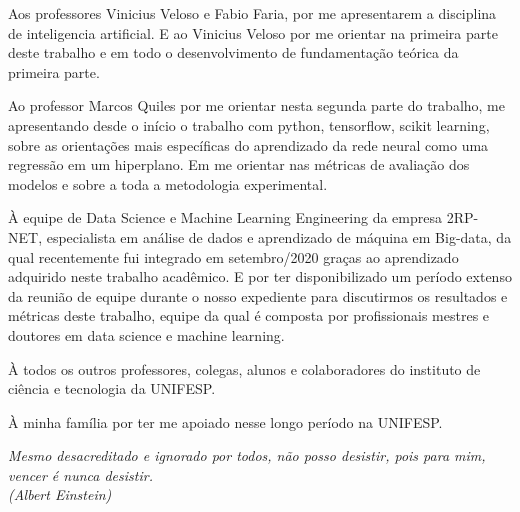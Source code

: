 \documentclass[	12pt, Times, openright, twoside, a4paper, english, brazil]{abntex2}
\begin{document}
\begin{agradecimentos}
            Aos professores Vinicius Veloso e Fabio Faria, por me apresentarem a disciplina de inteligencia artificial. E ao Vinicius Veloso por me orientar na primeira parte deste trabalho e em todo o desenvolvimento de fundamentação teórica da primeira parte.\newline
            
            Ao professor Marcos Quiles por me orientar nesta segunda parte do trabalho, me apresentando desde o início o trabalho com python, tensorflow, scikit learning, sobre as orientações mais específicas do aprendizado da rede neural como uma regressão em um hiperplano. Em me orientar nas métricas de avaliação dos modelos e sobre a toda a metodologia experimental.\newline
            
            À equipe de Data Science e Machine Learning Engineering da empresa 2RP-NET, especialista em análise de dados e aprendizado de máquina em Big-data, da qual recentemente fui integrado em setembro/2020 graças ao aprendizado adquirido neste trabalho acadêmico. E por ter disponibilizado um período extenso da reunião de equipe durante o nosso expediente para discutirmos os resultados e métricas deste trabalho, equipe da qual é composta por profissionais mestres e doutores em data science e machine learning.\newline
            
            À todos os outros professores, colegas, alunos e colaboradores do instituto de ciência e tecnologia da UNIFESP.\newline
                
            À minha família por ter me apoiado nesse longo período na UNIFESP.\newline

    \end{agradecimentos}

    \begin{epigrafe}
        \vspace*{\fill}
    	\begin{flushright}
    		\textit{Mesmo desacreditado e ignorado por todos, não posso desistir, pois para mim, vencer é nunca desistir.\\
    		(Albert Einstein)}
    	\end{flushright}
    \end{epigrafe}

\end{document}

